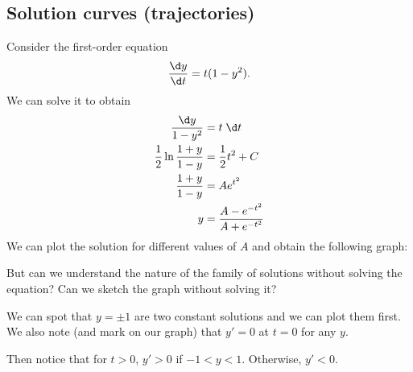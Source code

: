 \documentclass[a4paper]{article}
\begin{document}
\subsection{Solution curves (trajectories)}
\begin{eg}
  Consider the first-order equation
  \[
    \frac{\d y}{\d t} = t(1 - y^2).
  \]
  We can solve it to obtain
  \begin{align*}
    \frac{\d y}{1 - y^2} &= t\; \d t\\
    \frac{1}{2}\ln\frac{1 + y}{1 - y} &= \frac{1}{2}t^2 + C\\
    \frac{1 + y}{1 - y} &= Ae^{t^2}\\
    y &= \frac{A - e^{-t^2}}{A + e^{-t^2}}
  \end{align*}
  We can plot the solution for different values of $A$ and obtain the following graph:
  \begin{center}
  \end{center}
\end{eg}

But can we understand the nature of the family of solutions without solving the equation? Can we sketch the graph without solving it?

We can spot that $y = \pm 1$ are two constant solutions and we can plot them first. We also note (and mark on our graph) that $y' = 0$ at $t = 0$ for any $y$.

Then notice that for $t > 0$, $y' > 0$ if $-1 < y < 1$. Otherwise, $y' < 0$.
\end{document}
